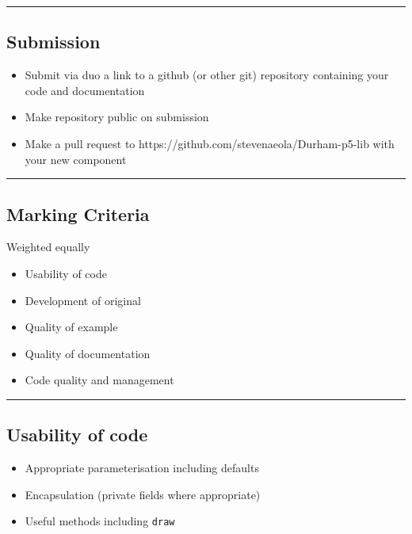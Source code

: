 \documentclass{article}[18pt]
\providecommand{\tightlist}{%
	\setlength{\itemsep}{0pt}\setlength{\parskip}{0pt}}
\begin{document}
\begin{center}\rule{0.5\linewidth}{\linethickness}\end{center}

\hypertarget{submission}{%
	\subsection{Submission}\label{submission}}

\begin{itemize}
	\tightlist
	\item
	Submit via duo a link to a github (or other git) repository containing
	your code and documentation
	\item
	Make repository public on submission
	\item
	Make a pull request to https://github.com/stevenaeola/Durham-p5-lib
	with your new component
\end{itemize}

\begin{center}\rule{0.5\linewidth}{\linethickness}\end{center}

\hypertarget{marking-criteria}{%
	\subsection{Marking Criteria}\label{marking-criteria}}

Weighted equally

\begin{itemize}
	\tightlist
	\item
	Usability of code
	\item
	Development of original
	\item
	Quality of example
	\item
	Quality of documentation
	\item
	Code quality and management
\end{itemize}

\begin{center}\rule{0.5\linewidth}{\linethickness}\end{center}

\hypertarget{usability-of-code}{%
	\subsection{Usability of code}\label{usability-of-code}}

\begin{itemize}
	\tightlist
	\item
	Appropriate parameterisation including defaults
	\item
	Encapsulation (private fields where appropriate)
	\item
	Useful methods including \texttt{draw}
\end{itemize}
\end{document}
